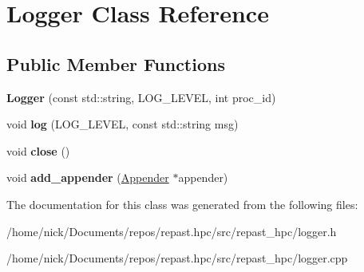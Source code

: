 \hypertarget{class_logger}{\section{Logger Class Reference}
\label{class_logger}
}
\subsection*{Public Member Functions}
\begin{DoxyCompactItemize}
\item 
\hypertarget{class_logger_ad4bef2613eb1eba924d90561c646203a}{{\bfseries Logger} (const std\-::string, L\-O\-G\-\_\-\-L\-E\-V\-E\-L, int proc\-\_\-id)}\label{class_logger_ad4bef2613eb1eba924d90561c646203a}

\item 
\hypertarget{class_logger_ac05e48b3ad9831593c664a7e1a198e47}{void {\bfseries log} (L\-O\-G\-\_\-\-L\-E\-V\-E\-L, const std\-::string msg)}\label{class_logger_ac05e48b3ad9831593c664a7e1a198e47}

\item 
\hypertarget{class_logger_afee2bab560c2db0190c980884d33868c}{void {\bfseries close} ()}\label{class_logger_afee2bab560c2db0190c980884d33868c}

\item 
\hypertarget{class_logger_a7075e9cf5373d978dd346040f09043a8}{void {\bfseries add\-\_\-appender} (\hyperlink{class_appender}{Appender} $\ast$appender)}\label{class_logger_a7075e9cf5373d978dd346040f09043a8}

\end{DoxyCompactItemize}


The documentation for this class was generated from the following files\-:\begin{DoxyCompactItemize}
\item 
/home/nick/\-Documents/repos/repast.\-hpc/src/repast\-\_\-hpc/logger.\-h\item 
/home/nick/\-Documents/repos/repast.\-hpc/src/repast\-\_\-hpc/logger.\-cpp\end{DoxyCompactItemize}
